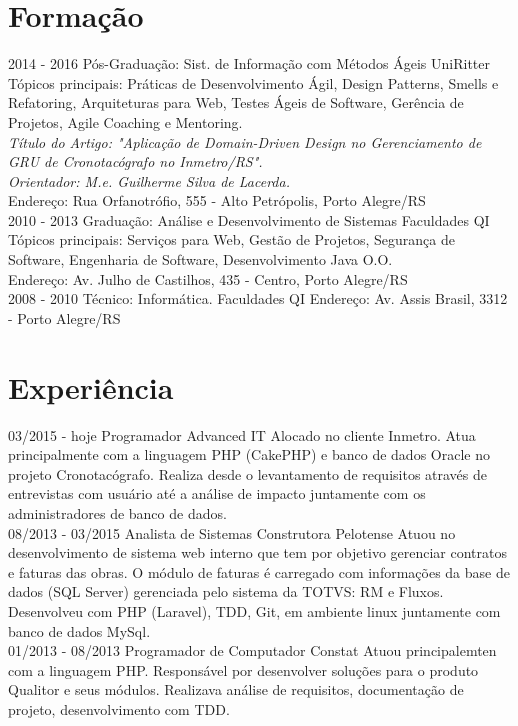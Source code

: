 \documentclass[]{friggeri-cv}
\begin{document}
\section{Formação}
\begin{entrylist}
  \entry
    {2014 - 2016}
    {Pós-Graduação: Sist. de Informação com Métodos Ágeis}
    {UniRitter}
    {Tópicos principais: Práticas de Desenvolvimento Ágil, Design Patterns, Smells e Refatoring, Arquiteturas para Web, Testes Ágeis de Software, Gerência de Projetos, Agile Coaching e Mentoring.\\
    \emph{Título do Artigo: "Aplicação de Domain-Driven Design no Gerenciamento de
GRU de Cronotacógrafo no Inmetro/RS".}\\
    \emph{Orientador: M.e. Guilherme Silva de Lacerda.}\\
    Endereço: Rua Orfanotrófio, 555 - Alto Petrópolis, Porto Alegre/RS\\}
  \entry
    {2010 - 2013}
    {Graduação: Análise e Desenvolvimento de Sistemas}
    {Faculdades QI}
    {Tópicos principais: Serviços para Web, Gestão de Projetos, Segurança de Software, Engenharia de Software, Desenvolvimento Java O.O.\\
    Endereço: Av. Julho de Castilhos, 435 - Centro, Porto Alegre/RS\\}    
  \entry
    {2008 - 2010}
    {Técnico: Informática.}
    {Faculdades QI}
    {Endereço: Av. Assis Brasil, 3312 - Porto Alegre/RS}
\end{entrylist}
\section{Experiência}
\begin{entrylist}
  \entry
    {03/2015 - hoje}
    {Programador}
    {Advanced IT}
    {Alocado no cliente Inmetro. Atua principalmente com a linguagem PHP (CakePHP) e banco de dados Oracle no projeto Cronotacógrafo. Realiza desde o levantamento de requisitos através de entrevistas com usuário até a análise de impacto juntamente com os administradores de banco de dados.\\}
  \entry
    {08/2013 - 03/2015}
    {Analista de Sistemas}
    {Construtora Pelotense}
    {Atuou no desenvolvimento de sistema web interno que tem por objetivo gerenciar contratos e faturas das obras. O módulo de faturas é carregado com informações da base de dados (SQL Server) gerenciada pelo sistema da TOTVS: RM e Fluxos. Desenvolveu com PHP (Laravel), TDD, Git, em ambiente linux juntamente com banco de dados MySql.\\}
    \entry
    {01/2013 - 08/2013}
    {Programador de Computador}
    {Constat}
    {Atuou principalemten com a linguagem PHP. Responsável por desenvolver soluções para o produto Qualitor e seus módulos. Realizava análise de requisitos, documentação de projeto, desenvolvimento com TDD.}
\end{entrylist}
\end{document}
